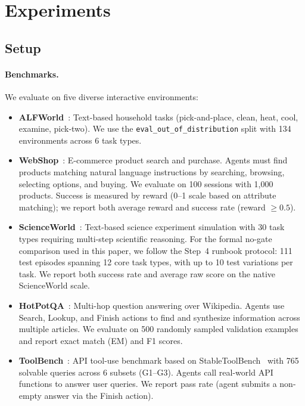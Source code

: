 \section{Experiments}
\label{sec:experiments}

\subsection{Setup}
\label{sec:setup}

\paragraph{Benchmarks.} We evaluate on five diverse interactive environments:
\begin{itemize}
    \item \textbf{ALFWorld}~\citep{shridhar2021alfworld}: Text-based household tasks (pick-and-place, clean, heat, cool, examine, pick-two). We use the \texttt{eval\_out\_of\_distribution} split with 134 environments across 6 task types.
    \item \textbf{WebShop}~\citep{yao2022webshop}: E-commerce product search and purchase. Agents must find products matching natural language instructions by searching, browsing, selecting options, and buying. We evaluate on 100 sessions with 1,000 products. Success is measured by reward (0--1 scale based on attribute matching); we report both average reward and success rate (reward $\geq 0.5$).
    \item \textbf{ScienceWorld}~\citep{wang2022scienceworld}: Text-based science experiment simulation with 30 task types requiring multi-step scientific reasoning. For the formal no-gate comparison used in this paper, we follow the Step~4 runbook protocol: 111 test episodes spanning 12 core task types, with up to 10 test variations per task. We report both success rate and average raw score on the native ScienceWorld scale.
    \item \textbf{HotPotQA}~\citep{yang2018hotpotqa}: Multi-hop question answering over Wikipedia. Agents use Search, Lookup, and Finish actions to find and synthesize information across multiple articles. We evaluate on 500 randomly sampled validation examples and report exact match (EM) and F1 scores.
    \item \textbf{ToolBench}~\citep{qin2023toolllm}: API tool-use benchmark based on StableToolBench~\citep{guo2024stabletoolbench} with 765 solvable queries across 6 subsets (G1--G3). Agents call real-world API functions to answer user queries. We report pass rate (agent submits a non-empty answer via the Finish action).
\end{itemize}

